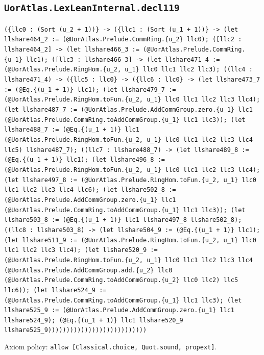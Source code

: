 \documentclass[11pt]{article}
\begin{document}
\subsection*{\texttt{UorAtlas.LexLeanInternal.decl119}}
\noindent\texttt{(\{llc0 : (Sort (u\_2 + 1))\} -> (\{llc1 : (Sort (u\_1 + 1))\} -> (let llshare464\_2 := (@UorAtlas.Prelude.CommRing.\{u\_2\} llc0); ([llc2 : llshare464\_2] -> (let llshare466\_3 := (@UorAtlas.Prelude.CommRing.\{u\_1\} llc1); ([llc3 : llshare466\_3] -> (let llshare471\_4 := (@UorAtlas.Prelude.RingHom.\{u\_2, u\_1\} llc0 llc1 llc2 llc3); ((llc4 : llshare471\_4) -> (\{llc5 : llc0\} -> (\{llc6 : llc0\} -> (let llshare473\_7 := (@Eq.\{(u\_1 + 1)\} llc1); (let llshare479\_7 := (@UorAtlas.Prelude.RingHom.toFun.\{u\_2, u\_1\} llc0 llc1 llc2 llc3 llc4); (let llshare487\_7 := (@UorAtlas.Prelude.AddCommGroup.zero.\{u\_1\} llc1 (@UorAtlas.Prelude.CommRing.toAddCommGroup.\{u\_1\} llc1 llc3)); (let llshare488\_7 := (@Eq.\{(u\_1 + 1)\} llc1 (@UorAtlas.Prelude.RingHom.toFun.\{u\_2, u\_1\} llc0 llc1 llc2 llc3 llc4 llc5) llshare487\_7); ((llc7 : llshare488\_7) -> (let llshare489\_8 := (@Eq.\{(u\_1 + 1)\} llc1); (let llshare496\_8 := (@UorAtlas.Prelude.RingHom.toFun.\{u\_2, u\_1\} llc0 llc1 llc2 llc3 llc4); (let llshare497\_8 := (@UorAtlas.Prelude.RingHom.toFun.\{u\_2, u\_1\} llc0 llc1 llc2 llc3 llc4 llc6); (let llshare502\_8 := (@UorAtlas.Prelude.AddCommGroup.zero.\{u\_1\} llc1 (@UorAtlas.Prelude.CommRing.toAddCommGroup.\{u\_1\} llc1 llc3)); (let llshare503\_8 := (@Eq.\{(u\_1 + 1)\} llc1 llshare497\_8 llshare502\_8); ((llc8 : llshare503\_8) -> (let llshare504\_9 := (@Eq.\{(u\_1 + 1)\} llc1); (let llshare511\_9 := (@UorAtlas.Prelude.RingHom.toFun.\{u\_2, u\_1\} llc0 llc1 llc2 llc3 llc4); (let llshare520\_9 := (@UorAtlas.Prelude.RingHom.toFun.\{u\_2, u\_1\} llc0 llc1 llc2 llc3 llc4 (@UorAtlas.Prelude.AddCommGroup.add.\{u\_2\} llc0 (@UorAtlas.Prelude.CommRing.toAddCommGroup.\{u\_2\} llc0 llc2) llc5 llc6)); (let llshare524\_9 := (@UorAtlas.Prelude.CommRing.toAddCommGroup.\{u\_1\} llc1 llc3); (let llshare525\_9 := (@UorAtlas.Prelude.AddCommGroup.zero.\{u\_1\} llc1 llshare524\_9); (@Eq.\{(u\_1 + 1)\} llc1 llshare520\_9 llshare525\_9)))))))))))))))))))))))))))}\par
\noindent Axiom policy: \texttt{allow [Classical.choice, Quot.sound, propext]}.\par
\end{document}
